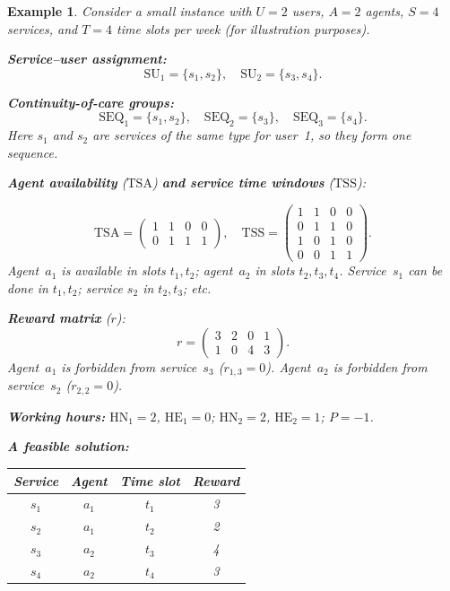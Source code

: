 \documentclass[11pt,a4paper]{article}
\newcommand{\SU}{\mathrm{SU}}
\newcommand{\SEQ}{\mathrm{SEQ}}
\newcommand{\TSA}{\mathrm{TSA}}
\newcommand{\TSS}{\mathrm{TSS}}
\newcommand{\HN}{\mathrm{HN}}
\newcommand{\HE}{\mathrm{HE}}
\newtheorem{example}{Example}
\begin{document}
\begin{example}
Consider a small instance with $U=2$ users, $A=2$ agents,
$S=4$ services, and $T=4$ time slots per week (for illustration purposes).

\medskip\noindent
\textbf{Service--user assignment:}
\[
    \SU_1 = \{s_1, s_2\}, \quad \SU_2 = \{s_3, s_4\}.
\]

\noindent
\textbf{Continuity-of-care groups:}
\[
    \SEQ_1 = \{s_1, s_2\}, \quad \SEQ_2 = \{s_3\}, \quad \SEQ_3 = \{s_4\}.
\]
Here $s_1$ and $s_2$ are services of the same type for user~1, so they form
one sequence.

\medskip\noindent
\textbf{Agent availability} ($\TSA$) \textbf{and service time windows} ($\TSS$):

\[
\TSA = \begin{pmatrix}
1 & 1 & 0 & 0 \\
0 & 1 & 1 & 1
\end{pmatrix}, \quad
\TSS = \begin{pmatrix}
1 & 1 & 0 & 0 \\
0 & 1 & 1 & 0 \\
1 & 0 & 1 & 0 \\
0 & 0 & 1 & 1
\end{pmatrix}.
\]
Agent~$a_1$ is available in slots $t_1,t_2$; agent~$a_2$ in slots $t_2,t_3,t_4$.
Service~$s_1$ can be done in $t_1,t_2$; service $s_2$ in $t_2,t_3$; etc.

\medskip\noindent
\textbf{Reward matrix} ($r$):
\[
r = \begin{pmatrix}
3 & 2 & 0 & 1 \\
1 & 0 & 4 & 3
\end{pmatrix}.
\]
Agent~$a_1$ is forbidden from service~$s_3$ ($r_{1,3}=0$).
Agent~$a_2$ is forbidden from service~$s_2$ ($r_{2,2}=0$).

\medskip\noindent
\textbf{Working hours:}
$\HN_1 = 2$, $\HE_1 = 0$; $\HN_2 = 2$, $\HE_2 = 1$; $P = -1$.

\medskip\noindent
\textbf{A feasible solution:}
\begin{center}
\begin{tabular}{cccc}
\toprule
Service & Agent & Time slot & Reward \\
\midrule
$s_1$ & $a_1$ & $t_1$ & 3 \\
$s_2$ & $a_1$ & $t_2$ & 2 \\
$s_3$ & $a_2$ & $t_3$ & 4 \\
$s_4$ & $a_2$ & $t_4$ & 3 \\
\bottomrule
\end{tabular}
\end{center}


\end{example}
\end{document}
